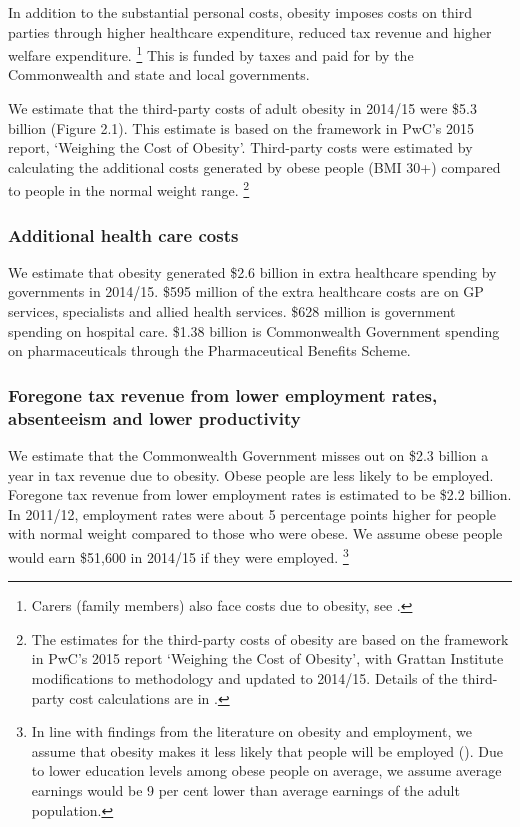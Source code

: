 \documentclass[embargoed]{grattan}
\begin{document}
In addition to the substantial personal costs, obesity imposes costs on third parties through higher healthcare expenditure, reduced tax revenue and higher welfare expenditure.%
\footnote{Carers (family members) also face costs due to obesity, see \textcite{Freebairn2010Taxationobesity}.} This is funded by taxes and paid for by the Commonwealth and state and local governments.

We estimate that the third-party costs of adult obesity in 2014/15 were \$5.3 billion (Figure 2.1).
This estimate is based on the framework in PwC's 2015 report, `Weighing the Cost of Obesity'.
Third-party costs were estimated by calculating the additional costs generated by obese people (BMI 30+) compared to people in the normal weight range.%
\footnote{The estimates for the third-party costs of obesity are based on the framework in PwC's 2015 report `Weighing the Cost of Obesity', with Grattan Institute modifications to methodology and updated to 2014/15.
Details of the third-party cost calculations are in .}

\subsubsection{Additional health care costs}\label{additional-health-care-costs}

We estimate that obesity generated \$2.6 billion in extra healthcare spending by governments in 2014/15. \$595 million of the extra healthcare costs are on GP services, specialists and allied health services. \$628 million is government spending on hospital care. \$1.38 billion is Commonwealth Government spending on pharmaceuticals through the Pharmaceutical Benefits Scheme.

\subsubsection{Foregone tax revenue from lower employment rates, absenteeism and lower productivity}\label{foregone-tax-revenue-from-lower-employment-rates-absenteeism-and-lower-productivity}

We estimate that the Commonwealth Government misses out on \$2.3 billion a year in tax revenue due to obesity.
Obese people are less likely to be employed.
Foregone tax revenue from lower employment rates is estimated to be \$2.2 billion.
In 2011/12, employment rates were about 5 percentage points higher for people with normal weight compared to those who were obese.
We assume obese people would earn \$51,600 in 2014/15 if they were employed. \footnote{In line with findings from the literature on obesity and employment, we assume that obesity makes it less likely that people will be employed (\textcites{Boeckerman2016EffectWeightLabor}{Reichert2015Obesityweightloss}{Cawley2015economyscalesselective}{Rooth2009Obesityattractivenessdifferential}).
Due to lower education levels among obese people on average, we assume average earnings would be 9 per cent lower than average earnings of the adult population.}
\end{document}
